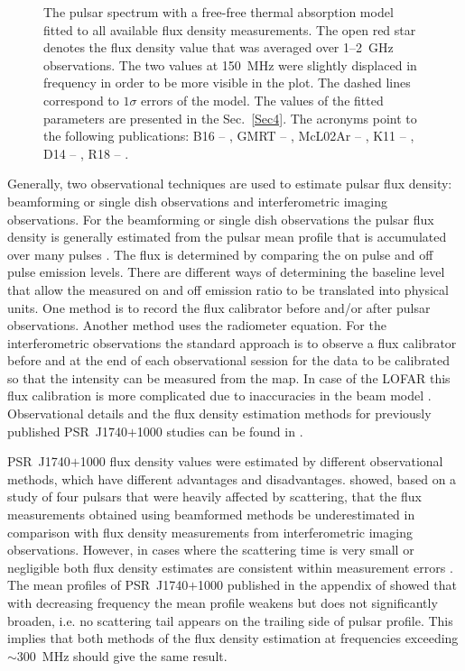 \documentclass[manuscript]{aastex63}
\begin{document}
\begin{figure}[ht!]
\caption{The pulsar spectrum with a free-free thermal absorption model fitted to all available flux density measurements. The open red star denotes the flux density value that was averaged over 1--2~GHz observations. The two values at 150~MHz were slightly displaced in frequency in order to be more visible in the plot. The dashed lines correspond to $1 \sigma$ errors of the model. The values of the fitted parameters are presented in the Sec.~\ref{Sec4}. The acronyms point to the following publications: B16 -- \citet{2016Bilous}, GMRT -- \citet{2018Rozko}, McL02Ar -- \citet{2002McLaughlin}, K11 -- \citep{2011KijakB}, D14 -- \citet{2014Dembska}, R18 -- \citet{2018Rozko}. 
\label{fig:spectrum}}
\end{figure}

 Generally, two observational techniques are used to estimate pulsar flux density: beamforming or single dish observations and interferometric imaging observations. For the beamforming or single dish observations the pulsar flux density is generally estimated from the pulsar mean profile that is accumulated over many pulses \citep{2012Lorimer}. The flux is determined by comparing the on pulse and off pulse emission levels. There are different ways of determining the baseline level that allow the measured on and off emission ratio to be translated into physical units. One method is to record the flux calibrator before and/or after pulsar observations. Another method uses the radiometer equation. For the interferometric observations the standard approach is to observe a flux calibrator before and at the end of each observational session for the data to be calibrated so that the intensity can be measured from the map. In case of the LOFAR this flux calibration is more complicated due to inaccuracies in the beam model \citep[e.g.][]{2019Shimwell}. Observational details and the flux density estimation methods for previously published  PSR~J1740$+$1000 studies can be found in \citealt{2018Rozko}.

PSR~J1740$+$1000 flux density values were estimated by different observational methods, which have different advantages and disadvantages. \citealt{2015Dembska} showed, based on a study of four pulsars that were heavily affected by scattering, that the flux measurements obtained using beamformed methods be underestimated in comparison with flux density measurements from interferometric imaging observations. However, in cases where the scattering time is very small or negligible both flux density estimates are consistent within measurement errors \citep{2015Dembska,2016Basu}. The mean profiles of PSR~J1740$+$1000 published in the appendix of \citealt{2018Rozko} showed that with decreasing frequency the mean profile weakens but does not significantly broaden, i.e. no scattering tail appears on the  trailing side of pulsar profile. This implies that both methods of the flux density estimation at frequencies exceeding $\sim 300$~MHz should give the same result. 
\end{document}
